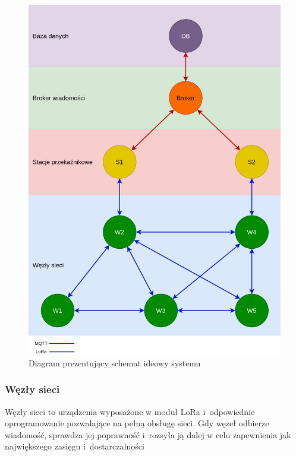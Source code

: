 \begin{figure}[p!]
    \begin{center}
        \includegraphics[width=15cm]{pic/diagram-systemu.png}
    \end{center}
    \caption{Diagram prezentujący schemat ideowy systemu}\label{rys:system-diagram}
\end{figure}

\subsubsection{Węzły sieci}
Węzły sieci to urządzenia wyposażone w moduł LoRa i~odpowiednie oprogramowanie pozwalające na pełną obsługę sieci.
Gdy węzeł odbierze wiadomość, sprawdza jej poprawność i~rozsyła ją dalej w celu zapewnienia jak największego zasięgu i~dostarczalności


